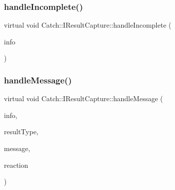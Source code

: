 \subsubsection{\texorpdfstring{handle\+Incomplete()}{handleIncomplete()}}
{\footnotesize\ttfamily virtual void Catch\+::\+I\+Result\+Capture\+::handle\+Incomplete (\begin{DoxyParamCaption}\item[{\mbox{\hyperlink{struct_catch_1_1_assertion_info}{Assertion\+Info}} const \&}]{info }\end{DoxyParamCaption})\hspace{0.3cm}{\ttfamily [pure virtual]}}

\mbox{\label{struct_catch_1_1_i_result_capture_a21788ebc64571abf322b80c8cc51794d}} 
\subsubsection{\texorpdfstring{handle\+Message()}{handleMessage()}}
{\footnotesize\ttfamily virtual void Catch\+::\+I\+Result\+Capture\+::handle\+Message (\begin{DoxyParamCaption}\item[{\mbox{\hyperlink{struct_catch_1_1_assertion_info}{Assertion\+Info}} const \&}]{info,  }\item[{\mbox{\hyperlink{struct_catch_1_1_result_was_a624e1ee3661fcf6094ceef1f654601ef}{Result\+Was\+::\+Of\+Type}}}]{result\+Type,  }\item[{\mbox{\hyperlink{class_catch_1_1_string_ref}{String\+Ref}} const \&}]{message,  }\item[{\mbox{\hyperlink{struct_catch_1_1_assertion_reaction}{Assertion\+Reaction}} \&}]{reaction }\end{DoxyParamCaption})\hspace{0.3cm}{\ttfamily [pure virtual]}}

\mbox{\label{struct_catch_1_1_i_result_capture_ab7dbdf8aa28427119583e24dbb302c63}} 
